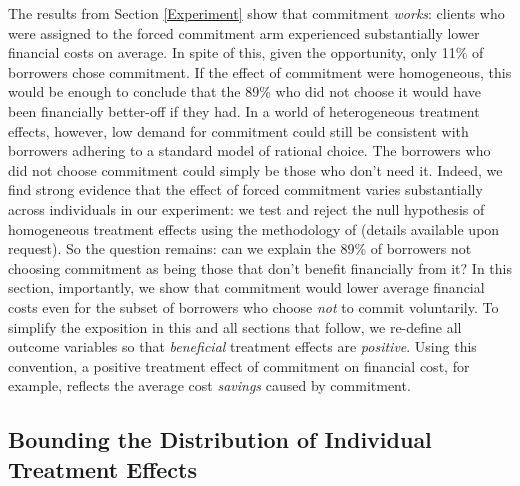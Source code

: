 \documentclass[12pt, a4paper]{article}
\begin{document}
The results from Section \ref{Experiment} show that commitment \emph{works}: clients who were assigned to the forced commitment arm experienced substantially lower financial costs on average.
In spite of this, given the opportunity, only 11\% of borrowers chose commitment. 
If the effect of commitment were homogeneous, this would be enough to conclude that the 89\% who did not choose it would have been financially better-off if they had.
In a world of heterogeneous treatment effects, however, low demand for commitment could still be consistent with borrowers adhering to a standard model of rational choice. 
The borrowers who did not choose commitment could simply be those who don't need it. 
Indeed, we find strong evidence that the effect of forced commitment varies substantially across individuals in our experiment: we test and reject
the null hypothesis of homogeneous treatment effects using the methodology of \cite{chernozhukov2018generic} (details available upon request).
So the question remains: can we explain the 89\% of borrowers not choosing commitment as being those that don't benefit financially from it?  
In this section, importantly, we show that commitment would lower average financial costs even for the subset of borrowers who choose \emph{not} to commit voluntarily.
To simplify the exposition in this and all sections that follow, we re-define all outcome variables so that \emph{beneficial} treatment effects are \emph{positive}. Using this convention, a positive treatment effect of commitment on financial cost, for example, reflects the average cost \emph{savings} caused by commitment.

\subsection{Bounding the Distribution of Individual Treatment Effects}
\label{sec:bounds}
\end{document}
